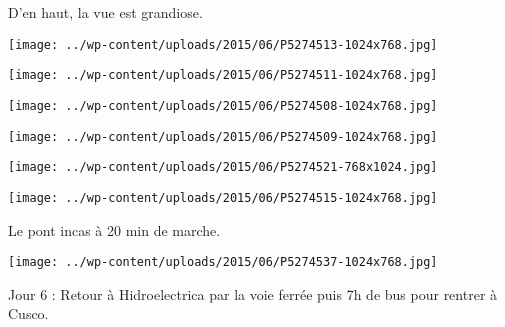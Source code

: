 D'en haut, la vue est grandiose.
\begin{center} \texttt{[image: ../wp-content/uploads/2015/06/P5274513-1024x768.jpg]} \end{center}
\begin{center} \texttt{[image: ../wp-content/uploads/2015/06/P5274511-1024x768.jpg]} \end{center}

\begin{center} \texttt{[image: ../wp-content/uploads/2015/06/P5274508-1024x768.jpg]} \end{center}
\begin{center} \texttt{[image: ../wp-content/uploads/2015/06/P5274509-1024x768.jpg]} \end{center}

\begin{center} \texttt{[image: ../wp-content/uploads/2015/06/P5274521-768x1024.jpg]} \end{center}
\begin{center} \texttt{[image: ../wp-content/uploads/2015/06/P5274515-1024x768.jpg]} \end{center}
\pagebreak

Le pont incas à 20 min de marche. 
\begin{center} \texttt{[image: ../wp-content/uploads/2015/06/P5274537-1024x768.jpg]} \end{center}

Jour 6 :  Retour à Hidroelectrica par la voie ferrée puis 7h de bus pour rentrer à Cusco.
